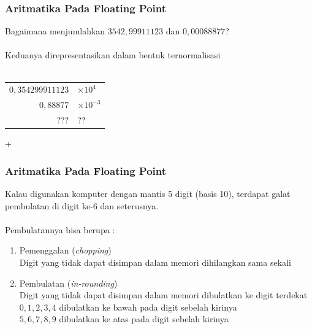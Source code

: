 \documentclass{beamer}
\begin{document}

\begin{frame}
\frametitle{Aritmatika Pada Floating Point}
Bagaimana menjumlahkan $3542,99911123$ dan $0,00088877$?
\\\ \\Keduanya direpresentasikan dalam bentuk ternormalisasi
\\\ \\\begin{tabular}{rl}
	$0,354299911123$ & $\times10^4$\\
	$0,88877$ & $\times10^{-3}$\\
	\hline
	??? & ??\\
\end{tabular}+

\end{frame}


\begin{frame}
\frametitle{Aritmatika Pada Floating Point}
Kalau digunakan komputer dengan mantis 5 digit (basis 10), terdapat galat pembulatan di digit ke-6 dan seterusnya. 
\\\ \\Pembulatannya bisa berupa :
\begin{enumerate}
\item Pemenggalan (\textit{chopping})
\\Digit yang tidak dapat disimpan dalam memori dihilangkan sama sekali
\item Pembulatan (\textit{in-rounding})
\\Digit yang tidak dapat disimpan dalam memori dibulatkan ke digit terdekat
\\$0,1,2,3,4$ dibulatkan ke bawah pada digit sebelah kirinya
\\$5,6,7,8,9$ dibulatkan ke atas pada digit sebelah kirinya
\end{enumerate}              
\end{frame}

\end{document}
